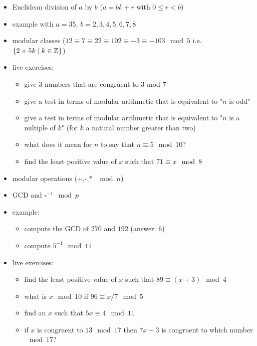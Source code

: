 \begin{itemize}
\tightlist
\item
  Euclidean division of \(a\) by \(b\) (\(a=bk+r\) with
  \(0 \leq r < b\))
\item
  example with \(a=35\), \(b=2,3,4,5,6,7,8\)
\item
  modular classes
  (\(12 \equiv 7 \equiv 22 \equiv 102 \equiv -3 \equiv -103 \mod 5\)
  i.e. \(\{2+5k \mid k \in \mathbb{Z} \}\))
\item
  live exercises:

  \begin{itemize}
  \tightlist
  \item
    give 3 numbers that are congruent to 3 mod 7
  \item
    give a test in terms of modular arithmetic that is equivalent to
    "\(n\) is odd"
  \item
    give a test in terms of modular arithmetic that is equivalent to
    "\(n\) is a nultiple of \(k\)" (for \(k\) a natural number greater
    than two)
  \item
    what does it mean for \(n\) to say that \(n \equiv 5 \mod 10\)?
  \item
    find the least positive value of \(x\) such that
    \(71 \equiv x \mod 8\)
  \end{itemize}
\item
  modular operations (+,-,* \(\mod n\))
\item
  GCD and \(\square^{-1} \mod p\)
\item
  example:

  \begin{itemize}
  \tightlist
  \item
    compute the GCD of \(270\) and \(192\) (answer: \(6\))
  \item
    compute \(5^{-1} \mod 11\)
  \end{itemize}
\item
  live exercises:

  \begin{itemize}
  \tightlist
  \item
    find the least positive value of \(x\) such that
    \(89 \equiv (x + 3) \mod 4\)
  \item
    what is \(x \mod 10\) if \(96 \equiv x / 7 \mod 5\)
  \item
    find an \(x\) such that \(5x \equiv 4 \mod 11\)
  \item
    if \(x\) is congruent to \(13 \mod 17\) then \(7x - 3\) is congruent
    to which number \(\mod 17\)?
  \end{itemize}
\end{itemize}

